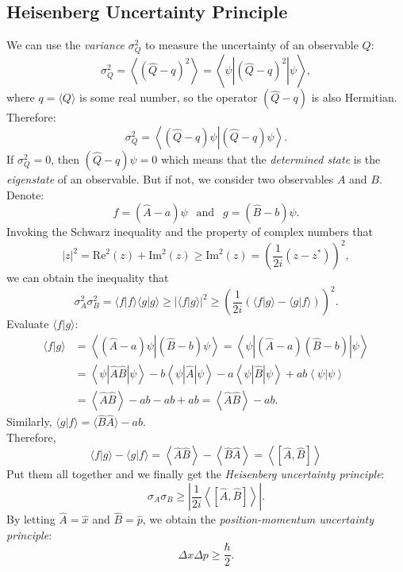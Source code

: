 	\subsection{Heisenberg Uncertainty Principle}
	We can use the \emph{variance} $\sigma_{Q}^{2}$ to measure the uncertainty of an observable $Q$:
	\[\sigma_{Q}^{2} = \left\langle\left(\hat{Q} - q\right)^{2}\right\rangle = \left\langle\psi\left|\left(\hat{Q}-q\right)^{2}\right|\psi\right\rangle,\]
	where $q=\langle Q \rangle$ is some real number, so the operator $\left(\hat{Q}-q\right)$ is also Hermitian. Therefore:
	\[\sigma_{Q}^{2} = \left\langle\left(\hat{Q} - q\right)\psi\left|\left(\hat{Q} - q\right)\psi\right\rangle\right..\]
	If $\sigma_{Q}^{2}=0$, then $\left(\hat{Q} - q\right)\psi=0$ which means that the \emph{determined state} is the \emph{eigenstate} of an observable. 
	But if not, we consider two observables $A$ and $B$. Denote:
	\[f = \left(\hat{A} - a\right)\psi\ \ \text{    and    }\ \ g = \left(\hat{B} - b\right)\psi.\]
	Invoking the Schwarz inequality and the property of complex numbers that
	\[|z|^{2} = \text{Re}^2(z)+\text{Im}^2(z) \geq\text{Im}^2(z)= \left(\frac{1}{2i}(z-z^*)\right)^2,\]
	we can obtain the inequality that
	\[\sigma^{2}_{A}\sigma^{2}_{B} = \langle f|f \rangle\langle g|g \rangle	 
	\geq \left|\langle f|g \rangle\right|^2 \geq \left(\frac{1}{2i}\left(\langle f|g \rangle-\langle g|f \rangle\right)\right)^2.\]
	Evaluate $\langle f|g \rangle$:
	\[\begin{aligned}
		\langle f|g \rangle
		& = \left\langle\left(\hat{A} - a\right)\psi\left|\left(\hat{B} - b\right)\psi\right\rangle\right.
		= \left\langle\psi\left|\left(\hat{A} - a\right)\left(\hat{B} - b\right)\right|\psi\right\rangle \\
		& = \left\langle\psi\left|\hat{A}\hat{B}\right|\psi\right\rangle - b\left\langle\psi\left|\hat{A}\right|\psi\right\rangle 
		- a\left\langle\psi\left|\hat{B}\right|\psi\right\rangle + ab\left\langle\psi\left|\psi\right\rangle\right. \\
		& = \left\langle\hat{A}\hat{B}\right\rangle - ab - ab + ab = \left\langle\hat{A}\hat{B}\right\rangle - ab.
	\end{aligned}\]
	Similarly, $\langle g|f \rangle = \langle\hat{B}\hat{A}\rangle - ab$.\\
	Therefore, 
	\[\langle f|g \rangle-\langle g|f \rangle = \left\langle\hat{A}\hat{B}\right\rangle - \left\langle\hat{B}\hat{A}\right\rangle 
	= \left\langle\left[\hat{A},\hat{B}\right]\right\rangle\]
	Put them all together and we finally get the \emph{Heisenberg uncertainty principle}:
	\[\sigma_{A}\sigma_{B} \geq \left|\frac{1}{2i}\left\langle\left[\hat{A}, \hat{B}\right]\right\rangle\right|.\]
	By letting $\hat{A} = \hat{x}$ and $\hat{B} = \hat{p}$, we obtain the \emph{position-momentum uncertainty principle}:
	\[\Delta x \Delta p \geq \frac{\hbar}{2}.\]
	
